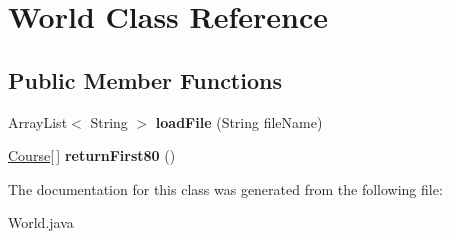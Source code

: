 \hypertarget{class_world}{}\section{World Class Reference}
\label{class_world}
\subsection*{Public Member Functions}
\begin{DoxyCompactItemize}
\item 
\hypertarget{class_world_a3d74182a02c917b50af9bda00e89fc3c}{}Array\+List$<$ String $>$ {\bfseries load\+File} (String file\+Name)\label{class_world_a3d74182a02c917b50af9bda00e89fc3c}

\item 
\hypertarget{class_world_ae0e0dbf23aa39e948dc4dd9789615c9c}{}\hyperlink{class_course}{Course}\mbox{[}$\,$\mbox{]} {\bfseries return\+First80} ()\label{class_world_ae0e0dbf23aa39e948dc4dd9789615c9c}

\end{DoxyCompactItemize}


The documentation for this class was generated from the following file\+:\begin{DoxyCompactItemize}
\item 
World.\+java\end{DoxyCompactItemize}
